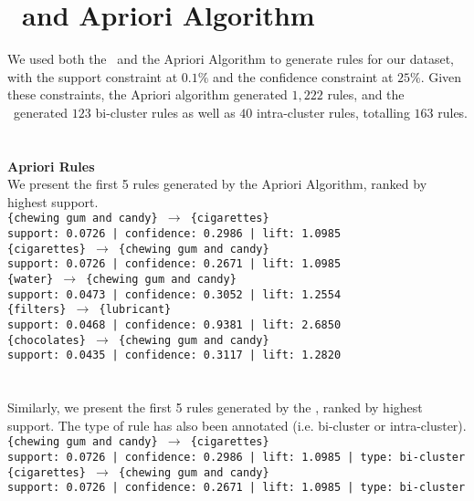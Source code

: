 \section{\algo\ and Apriori Algorithm}
We used both the \algo\ and the Apriori Algorithm to generate rules for our dataset, with the support constraint at $0.1\%$ and the confidence constraint at $25\%$. Given these constraints, the Apriori algorithm generated $1,222$ rules, and the \algo\ generated $123$ bi-cluster rules as well as $40$ intra-cluster rules, totalling $163$ rules.\\
\\\\\textbf{Apriori Rules}\\
We present the first 5 rules generated by the Apriori Algorithm, ranked by highest support.\\
\texttt{\{chewing gum and candy\} $\rightarrow$ \{cigarettes\}}\\\texttt{support: 0.0726 | confidence: 0.2986 | lift: 1.0985}\\
\texttt{\{cigarettes\} $\rightarrow$ \{chewing gum and candy\}}\\\texttt{support: 0.0726 | confidence: 0.2671 | lift: 1.0985}\\
\texttt{\{water\} $\rightarrow$ \{chewing gum and candy\}}\\\texttt{support: 0.0473 | confidence: 0.3052 | lift: 1.2554}\\
\texttt{\{filters\} $\rightarrow$ \{lubricant\}}\\\texttt{support: 0.0468 | confidence: 0.9381 | lift: 2.6850}\\
\texttt{\{chocolates\} $\rightarrow$ \{chewing gum and candy\}}\\\texttt{support: 0.0435 | confidence: 0.3117 | lift: 1.2820}\\
\\\textbf{\algo}\\
Similarly, we present the first 5 rules generated by the \algo, ranked by highest support. The type of rule has also been annotated (i.e. bi-cluster or intra-cluster).\\
\texttt{\{chewing gum and candy\} $\rightarrow$ \{cigarettes\}}\\\texttt{support: 0.0726 | confidence: 0.2986 | lift: 1.0985 | type: bi-cluster}\\
\texttt{\{cigarettes\} $\rightarrow$ \{chewing gum and candy\}}\\\texttt{support: 0.0726 | confidence: 0.2671 | lift: 1.0985 | type: bi-cluster}\\
